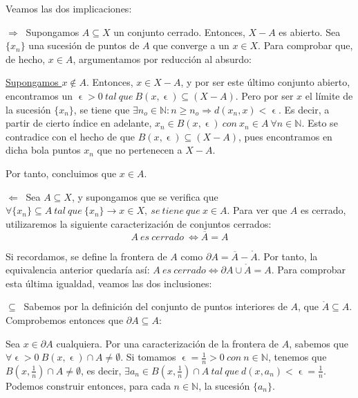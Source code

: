 \documentclass[11pt, a4paper, titlepage]{article}
\makeatletter
\let\epsilon\upvarepsilon
\renewenvironment{proof}[1][\proofname] {\vspace{-15pt}\par\pushQED{\qed}\normalfont\topsep6\p@\@plus6\p@\relax\trivlist\item[\hskip\labelsep\it#1\@addpunct{.}]\ignorespaces}{\popQED\endtrivlist\@endpefalse}
\theoremstyle{theorem-style}
\theoremstyle{definition-style}
\theoremstyle{remark-style}
\theoremstyle{example-style}
\makeatother
\begin{document}
\begin{proof} 
Veamos las dos implicaciones:

$\displaystyle \boxed{\Rightarrow}\ $ Supongamos $A \subseteq X$ un conjunto cerrado. Entonces, $X - A$ es abierto. Sea $\{x_n\}$ una sucesión de puntos de $A$ que converge a un $x\in X$. Para comprobar que, de hecho, $x\in A$, argumentamos por reducción al absurdo:

\underline{Supongamos $x\notin A$}. Entonces, $x\in X - A$, y por ser este último conjunto abierto, encontramos un $\epsilon > 0\ tal\ que\ B(x,\epsilon)\subseteq (X-A)$. Pero por ser $x$ el límite de la sucesión $\{x_n\}$, se tiene que $\exists n_o \in \mathbb{N}: n\geq n_o \Rightarrow d(x_n,x)<\epsilon$. Es decir, a partir de cierto índice en adelante, $x_n \in B(x,\epsilon)\ con\ x_n \in A\ \forall n \in \mathbb{N}$. Esto se contradice con el hecho de que $B(x,\epsilon)\subseteq (X-A)$, pues encontramos en dicha bola puntos $x_n$ que no pertenecen a $X-A$.

Por tanto, concluimos que $x\in A$.

$\displaystyle \boxed{\Leftarrow}\ $ Sea $A\subseteq X$, y supongamos que se verifica que $\forall \{x_n\} \subseteq A\ tal\ que\ \{x_n\} \rightarrow x \in X,\ se\ tiene\ que\ x\in A$. Para ver que $A$ es cerrado, utilizaremos la siguiente caracterización de conjuntos cerrados:
\vspace{0.5em}
$$A\ es\ cerrado\ \iff \overline{A} = A $$

Si recordamos, se define la frontera de $A$ como $\partial A = \overline{A} - \mathring{A}$. Por tanto, la equivalencia anterior quedaría así: $A\ es\ cerrado \iff \partial A \cup \mathring{A} = A$. Para comprobar esta última igualdad, veamos las dos inclusiones:

\begin{description}
\item $\displaystyle \boxed{\subseteq}\ $ Sabemos por la definición del conjunto de puntos interiores de $A$, que $\mathring{A} \subseteq A$. \\ Comprobemos entonces que $\partial A \subseteq A$:

Sea $x\in \partial A$ cualquiera. Por una caracterización de la frontera de $A$, sabemos que $\forall \epsilon > 0\ B(x,\epsilon)\cap A \neq \emptyset$. Si tomamos $\epsilon = \frac{1}{n} > 0\ con \ n\in \mathbb{N}$, tenemos que $B(x,\frac{1}{n})\cap A \neq \emptyset$, es decir, $\exists a_n \in B(x,\frac{1}{n})\cap A\ tal\ que\ d(x,a_n)<\epsilon = \frac{1}{n}$. Podemos construir entonces, para cada $n \in \mathbb{N}$, la sucesión $\{a_n\}$.


\end{description}
\end{proof}
\end{document}
